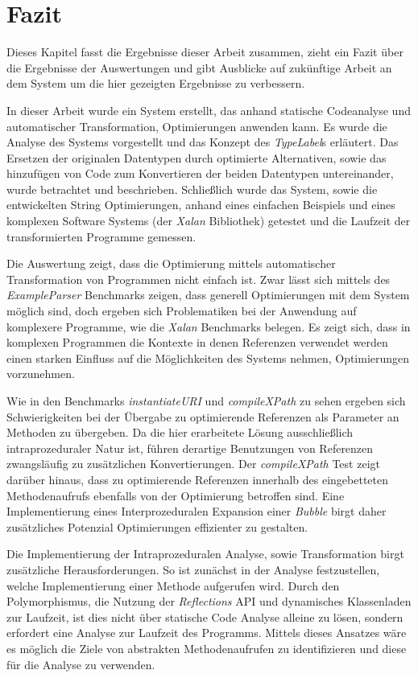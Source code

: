 \chapter{Fazit}

Dieses Kapitel fasst die Ergebnisse dieser Arbeit zusammen, zieht ein Fazit über
die Ergebnisse der Auswertungen und gibt Ausblicke auf zukünftige Arbeit an dem System 
um die hier gezeigten Ergebnisse zu verbessern. 

In dieser Arbeit wurde ein System erstellt, das anhand statische Codeanalyse und
automatischer Transformation, Optimierungen anwenden kann. Es wurde die Analyse des
Systems vorgestellt und das Konzept des \textit{TypeLabel}s erläutert. Das Ersetzen der 
originalen Datentypen durch optimierte Alternativen, sowie das hinzufügen von Code
zum Konvertieren der beiden Datentypen untereinander, wurde betrachtet und beschrieben.
Schließlich wurde das System, sowie die entwickelten String Optimierungen, anhand eines 
einfachen Beispiels und eines komplexen Software Systems (der \textit{Xalan} Bibliothek)
getestet und die Laufzeit der transformierten Programme gemessen. 

Die Auswertung zeigt, dass die Optimierung mittels automatischer Transformation von Programmen
nicht einfach ist. Zwar lässt sich mittels des \textit{ExampleParser} Benchmarks zeigen,
dass generell Optimierungen mit dem System möglich sind, doch ergeben sich Problematiken
bei der Anwendung auf komplexere Programme, wie die \textit{Xalan} Benchmarks belegen. 
Es zeigt sich, dass in komplexen Programmen die Kontexte in denen Referenzen verwendet
werden einen starken Einfluss auf die Möglichkeiten des Systems nehmen, Optimierungen
vorzunehmen. 

Wie in den Benchmarks \textit{instantiateURI} und \textit{compileXPath} zu sehen
ergeben sich Schwierigkeiten bei der Übergabe zu optimierende Referenzen als Parameter
an Methoden zu übergeben. Da die hier erarbeitete Lösung ausschließlich intraprozeduraler
Natur ist, führen derartige Benutzungen von Referenzen zwangsläufig zu zusätzlichen 
Konvertierungen. Der \textit{compileXPath} Test zeigt darüber hinaus, dass zu
optimierende Referenzen innerhalb des eingebetteten Methodenaufrufs ebenfalls von 
der Optimierung betroffen sind. Eine Implementierung eines Interprozeduralen Expansion
einer \textit{Bubble} birgt daher zusätzliches Potenzial Optimierungen effizienter zu gestalten.

Die Implementierung der Intraprozeduralen Analyse, sowie Transformation birgt zusätzliche
Herausforderungen. So ist zunächst in der Analyse festzustellen, welche Implementierung einer 
Methode aufgerufen wird. Durch den Polymorphismus, die Nutzung der \textit{Reflections} API und
dynamisches Klassenladen zur Laufzeit, ist dies nicht über statische Code Analyse alleine zu 
lösen, sondern erfordert eine Analyse zur Laufzeit des Programms. Mittels dieses Ansatzes wäre 
es möglich die Ziele von abstrakten Methodenaufrufen zu identifizieren und diese für die 
Analyse zu verwenden. 

